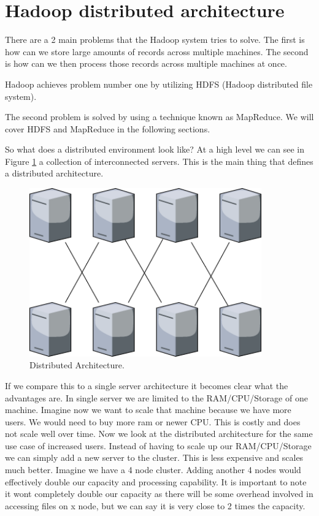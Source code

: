 \section{Hadoop distributed architecture}

There are a 2 main problems that the Hadoop system tries to solve. 
The first is how can we store large amounts of records across multiple machines.
The second is how can we then process those records across multiple machines at once.

Hadoop achieves problem number one by utilizing HDFS (Hadoop distributed file system). 

The second problem is solved by using a technique known as MapReduce.
We will cover HDFS and MapReduce in the following sections. 

So what does a distributed environment look like? At a high level we can see in Figure \ref{fig:distributed} a collection of interconnected servers. This is the main thing that defines a distributed architecture. 

\begin{figure}[H]
  \centering
  \includegraphics[scale=0.5,width=100mm]{./images/distributed.png}
  \caption{Distributed Architecture.}
  \label{fig:distributed}
\end{figure}

If we compare this to a single server architecture it becomes clear what the advantages are. In single server we are limited to the RAM/CPU/Storage of one machine. Imagine now we want to scale that machine because we have more users. We would need to buy more ram or newer CPU. This is costly and does not scale well over time. Now we look at the distributed architecture for the same use case of increased users. Instead of having to scale up our RAM/CPU/Storage we can simply add a new server to the cluster. This is less expensive and scales much better. Imagine we have a 4 node cluster. Adding another 4 nodes would effectively double our capacity and processing capability. It is important to note it wont completely double our capacity as there will be some overhead involved in accessing files on x node, but we can say it is very close to 2 times the capacity.
